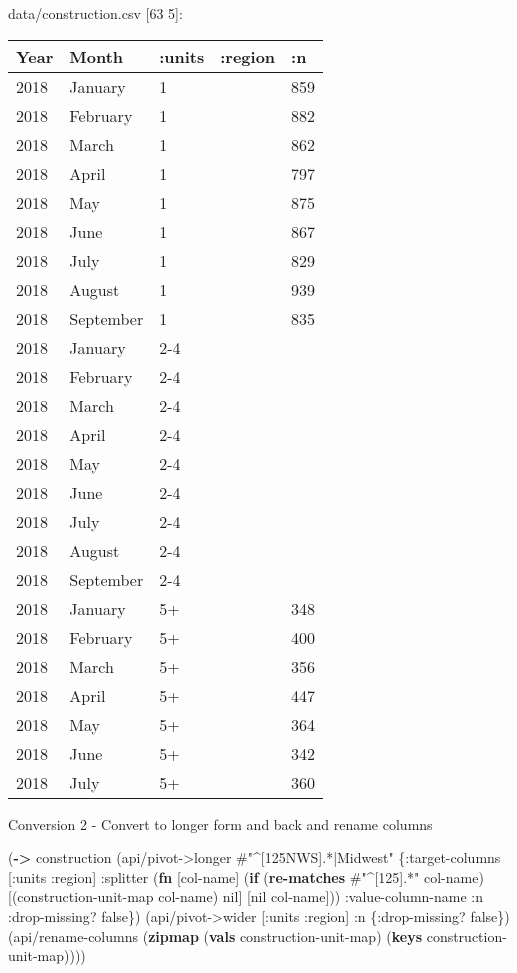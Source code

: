\documentclass[]{article}
\newenvironment{Shaded}{\begin{snugshade}}{\end{snugshade}}
\newcommand{\AttributeTok}[1]{\textcolor[rgb]{0.77,0.63,0.00}{#1}}
\newcommand{\KeywordTok}[1]{\textcolor[rgb]{0.13,0.29,0.53}{\textbf{#1}}}
\newcommand{\NormalTok}[1]{#1}
\newcommand{\SpecialStringTok}[1]{\textcolor[rgb]{0.31,0.60,0.02}{#1}}
\newcommand{\VariableTok}[1]{\textcolor[rgb]{0.00,0.00,0.00}{#1}}
\begin{document}
data/construction.csv {[}63 5{]}:

\begin{longtable}[]{@{}lllll@{}}
\toprule
Year & Month & :units & :region & :n\tabularnewline
\midrule
\endhead
2018 & January & 1 & & 859\tabularnewline
2018 & February & 1 & & 882\tabularnewline
2018 & March & 1 & & 862\tabularnewline
2018 & April & 1 & & 797\tabularnewline
2018 & May & 1 & & 875\tabularnewline
2018 & June & 1 & & 867\tabularnewline
2018 & July & 1 & & 829\tabularnewline
2018 & August & 1 & & 939\tabularnewline
2018 & September & 1 & & 835\tabularnewline
2018 & January & 2-4 & &\tabularnewline
2018 & February & 2-4 & &\tabularnewline
2018 & March & 2-4 & &\tabularnewline
2018 & April & 2-4 & &\tabularnewline
2018 & May & 2-4 & &\tabularnewline
2018 & June & 2-4 & &\tabularnewline
2018 & July & 2-4 & &\tabularnewline
2018 & August & 2-4 & &\tabularnewline
2018 & September & 2-4 & &\tabularnewline
2018 & January & 5+ & & 348\tabularnewline
2018 & February & 5+ & & 400\tabularnewline
2018 & March & 5+ & & 356\tabularnewline
2018 & April & 5+ & & 447\tabularnewline
2018 & May & 5+ & & 364\tabularnewline
2018 & June & 5+ & & 342\tabularnewline
2018 & July & 5+ & & 360\tabularnewline
\bottomrule
\end{longtable}

Conversion 2 - Convert to longer form and back and rename columns

\begin{Shaded}
\begin{Highlighting}[]
\NormalTok{(}\KeywordTok{->}\NormalTok{ construction}
\NormalTok{    (api/pivot->longer }\SpecialStringTok{#"^[125NWS].*|Midwest"}\NormalTok{ \{}\AttributeTok{:target-columns}\NormalTok{ [}\AttributeTok{:units} \AttributeTok{:region}\NormalTok{]}
                                               \AttributeTok{:splitter}\NormalTok{ (}\KeywordTok{fn}\NormalTok{ [col-name]}
\NormalTok{                                                           (}\KeywordTok{if}\NormalTok{ (}\KeywordTok{re-matches} \SpecialStringTok{#"^[125].*"}\NormalTok{ col-name)}
\NormalTok{                                                             [(construction-unit-map col-name) }\VariableTok{nil}\NormalTok{]}
\NormalTok{                                                             [}\VariableTok{nil}\NormalTok{ col-name]))}
                                               \AttributeTok{:value-column-name} \AttributeTok{:n}
                                               \AttributeTok{:drop-missing}\NormalTok{? }\VariableTok{false}\NormalTok{\})}
\NormalTok{    (api/pivot->wider [}\AttributeTok{:units} \AttributeTok{:region}\NormalTok{] }\AttributeTok{:n}\NormalTok{ \{}\AttributeTok{:drop-missing}\NormalTok{? }\VariableTok{false}\NormalTok{\})}
\NormalTok{    (api/rename-columns (}\KeywordTok{zipmap}\NormalTok{ (}\KeywordTok{vals}\NormalTok{ construction-unit-map)}
\NormalTok{                                (}\KeywordTok{keys}\NormalTok{ construction-unit-map))))}
\end{Highlighting}
\end{Shaded}
\end{document}
